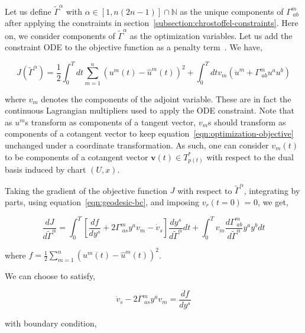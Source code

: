 \documentclass[a4paper,11pt]{elsarticle}
\begin{document}
Let us define $\tilde{\Gamma}^{\alpha}$ with $\alpha \in [1,n(2n-1)]
\cap \mathbb{N}$ as the unique components of $\Gamma^{m}_{\;ab}$ after
applying the constraints in
section~\ref{subsection:chrostoffel-constraints}. Here on, we consider
components of $\tilde{\Gamma}^{\alpha}$ as the optimization
variables. Let us add the constraint ODE to the objective function as
a penalty term~\cite{ref:adjoint-giles}. We have,

\begin{equation}\label{eqn:optimization-objective}
J(\tilde{\Gamma}^{\alpha}) = \frac{1}{2} \int_{0}^{T} dt
\sum_{m=1}^{n} (u^{m}(t) - \hat{u}^{m}(t))^2 + \int_{0}^{T} dt v_{m}
\left( \dot{u}^{m} + \Gamma^{m}_{\;ab} u^{a} u^{b} \right)
\end{equation}

where $v_{m}$ denotes the components of the adjoint variable. These
are in fact the continuous Lagrangian multipliers used to apply the
ODE constraint. Note that as $u^{m}$s transform as components of a
tangent vector, $v_{m}$s should transform as components of a cotangent
vector to keep equation~\ref{eqn:optimization-objective} unchanged
under a coordinate transformation. As such, one can consider
$v_{m}(t)$ to be components of a cotangent vector $\boldsymbol{v}(t)
\in T^{*}_{p(t)}$ with respect to the dual basis induced by chart $(U,
x)$.

Taking the gradient of the objective function $J$ with respect to
$\tilde{\Gamma}^{\alpha}$, integrating by parts, using
equation~\ref{eqn:geodesic-bc}, and imposing $v_{r}(t = 0)$ = 0, we
get,

\begin{equation}\label{eqn:objective-gradient-intg}
\frac{d J}{d \tilde{\Gamma}^{\alpha}} = \int_{0}^{T} \left[
  \frac{df}{dy^{s}} + 2 \Gamma^{m}_{\;as} y^{a} v_{m} - \dot{v}_{s}
  \right] \frac{d y^{s}}{d \tilde{\Gamma}^{\alpha}} dt + \int_{0}^{T}
v_{m} \frac{d \Gamma^{m}_{\;ab}}{d \tilde{\Gamma}^{\alpha}} y^{a} y^{b}
dt
\end{equation}

where $f = \frac{1}{2} \sum_{m=1}^{n} (u^{m}(t) -
\hat{u}^{m}(t))^2$. 

We can choose to satisfy,

\begin{equation}\label{eqn:adjoint-equation}
\dot{v}_{s} - 2 \Gamma^{m}_{\;as} y^{a} v_{m} = \frac{df}{dy^{s}}
\end{equation}

with boundary condition,
\end{document}
